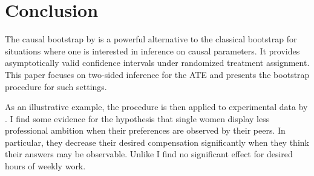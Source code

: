 \documentclass[aodsor,preprint]{imsart}
\numberwithin{equation}{section}
\theoremstyle{plain}
\begin{document}
\section{Conclusion} \label{Conclusion}

The causal bootstrap by \cite{Imbens_2021} is a powerful alternative to the classical bootstrap for situations where one is interested in inference on causal parameters. It provides asymptotically valid confidence intervals under randomized treatment assignment. This paper focuses on two-sided inference for the ATE and presents the bootstrap procedure for such settings.

As an illustrative example, the procedure is then applied to experimental data by \cite{Bursztyn_2017}. I find some evidence for the hypothesis that single women display less professional ambition when their preferences are observed by their peers. In particular, they decrease their desired compensation significantly when they think their answers may be observable. Unlike \cite{Bursztyn_2017} I find no significant effect for desired hours of weekly work. 






{}
\end{document}
